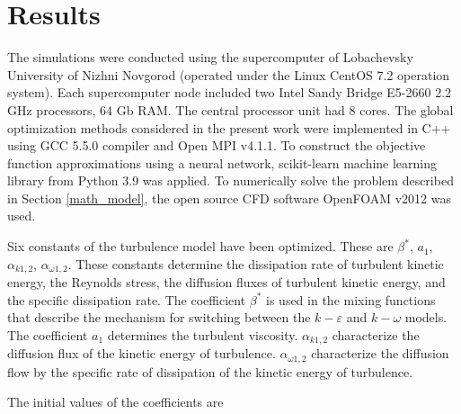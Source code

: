 \documentclass[mathematics,article,submit,pdftex,moreauthors]{Definitions/mdpi}
\begin{document}
\section{Results}





The simulations were conducted using the supercomputer of Lobachevsky University of Nizhni Novgorod (operated under the Linux CentOS 7.2 operation system). Each supercomputer node included two Intel Sandy Bridge E5-2660 2.2 GHz processors, 64 Gb RAM. The central processor unit had 8 cores. 
The global optimization methods considered in the present work were implemented in C++ using GCC 5.5.0 compiler and Open MPI v4.1.1. To construct the objective function approximations using a neural network, scikit-learn machine learning library from Python 3.9 was applied. 
To numerically solve the problem described in Section \ref{math_model}, the open source CFD software OpenFOAM v2012 \cite{OpenFOAM} was used.

Six constants of the turbulence model have been optimized. These are $\beta^*$, $a_1$, $\alpha_{k 1,2}$, $\alpha_{\omega 1,2}$. These constants determine the dissipation rate of turbulent kinetic energy, the Reynolds stress, the diffusion fluxes of turbulent kinetic energy, and the specific dissipation rate. The coefficient $\beta^*$ is used in the mixing functions that describe the mechanism for switching between the $k-\varepsilon$ and $k-\omega$ models. The coefficient $a_1$ determines the turbulent viscosity. $\alpha_{k 1,2}$ characterize the diffusion flux of the kinetic energy of turbulence. $\alpha_{\omega 1,2}$ characterize the diffusion flow by the specific rate of dissipation of the kinetic energy of turbulence.

The initial values of the coefficients are
\end{document}
